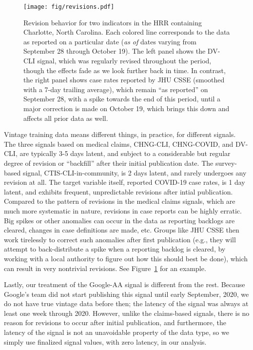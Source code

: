 \documentclass[9pt,twocolumn,twoside,lineno]{pnas-new}
\begin{document}
\begin{figure}[tb!]
  \texttt{[image: fig/revisions.pdf]}
  \caption{Revision behavior for two indicators in the HRR containing Charlotte, 
    North Carolina.  Each colored line corresponds to the data as reported on a
    particular date (\textit{as of} dates varying from September 28 through
    October 19). The left panel shows the DV-CLI signal, which was regularly
    revised throughout the period, though the effects fade as we look further
    back in time. In contrast, the right panel shows case rates reported by JHU
    CSSE (smoothed with a 7-day trailing average), which remain ``as reported''
    on September 28, with a spike towards the end of this period, until a major 
    correction is made on October 19, which brings this down and affects all
    prior data as well.}  
  \label{fig:vintage}
\end{figure}

Vintage training data means different things, in practice, for different
signals. The three signals based on medical claims, CHNG-CLI, CHNG-COVID, and
DV-CLI, are typically 3-5 days latent, and subject to a considerable but
regular degree of revision or ``backfill'' after their initial publication date.
The survey-based signal, CTIS-CLI-in-community, is 2 days latent, and rarely
undergoes any revision at all.  The target variable itself, reported COVID-19
case rates, is 1 day latent, and exhibits frequent, unpredictable revisions
after intial publication.  Compared to the pattern of revisions in the medical 
claims signals, which are much more systematic in nature, revisions in case
reports can be highly erratic. Big spikes or other anomalies can occur in the
data as reporting backlogs are cleared, changes in case definitions are made,
etc. Groups like JHU CSSE then work tirelessly to correct such anomalies after
first publication (e.g., they will attempt to back-distribute a spike when a
reporting backlog is cleared, by working with a local authority to figure out
how this should best be done), which can result in very nontrivial revisions.
See Figure~\ref{fig:vintage} for an example. 

Lastly, our treatment of the Google-AA signal is different from the rest.
Because Google's team did not start publishing this signal until early
September, 2020, we do not have true vintage data before then; the latency of 
the signal was always at least one week through 2020.  However, unlike the
claims-based signals, there is no reason for revisions to occur after initial
publication, and furthermore, the latency of the signal is not an unavoidable
property of the data type, so we simply use finalized signal values, with zero
latency, in our analysis. 
\end{document}
